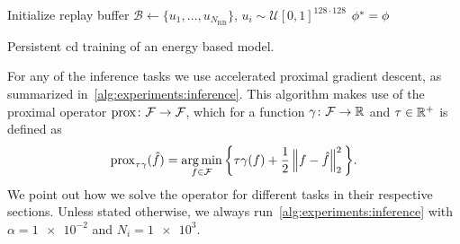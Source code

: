 \documentclass[../ml-ct.tex]{subfiles}
\begin{document}
\begin{algorithm}[t]
	\DontPrintSemicolon%
	Initialize replay buffer \( \mathcal{B} \leftarrow \{ u_1,\dotsc,u_{N_\text{RB}} \} \), \( u_i \sim \mathcal{U}{[0, 1]}^{128\cdot128} \)\;
	\( \phi^*_{\text{}} = \phi \)
	\caption{Persistent \gls{cd} training of an energy based model.}%
	\label{alg:experiments:training}
\end{algorithm}

For any of the inference tasks we use accelerated proximal gradient descent, as summarized in~\cref{alg:experiments:inference}.
This algorithm makes use of the proximal operator \( \operatorname{prox}\colon\mathcal{F}\to\mathcal{F} \), which for a function \( \gamma\colon\mathcal{F}\to\mathbb{R} \) and \( \tau \in \mathbb{R}^+ \) is defined as
\begin{equation}
	\operatorname{prox}_{\tau \gamma} (\hat{f}) = \operatorname*{arg\,min}_{f \in \mathcal{F}} \bigg\{ \tau\gamma(f) + \frac{1}{2} \left\lVert f - \hat{f}\right\rVert_2^2 \bigg\}.
\end{equation}
We point out how we solve the operator for different tasks in their respective sections.
Unless stated otherwise, we always run~\cref{alg:experiments:inference} with \( \alpha = \num{1e-2} \) and \( N_i = \num{1e3} \).
\end{document}
